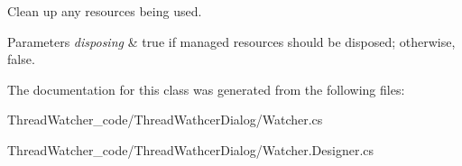 Clean up any resources being used. 


\begin{DoxyParams}{Parameters}
{\em disposing} & true if managed resources should be disposed; otherwise, false.\\
\hline
\end{DoxyParams}


The documentation for this class was generated from the following files\+:\begin{DoxyCompactItemize}
\item 
Thread\+Watcher\+\_\+code/\+Thread\+Wathcer\+Dialog/Watcher.\+cs\item 
Thread\+Watcher\+\_\+code/\+Thread\+Wathcer\+Dialog/Watcher.\+Designer.\+cs\end{DoxyCompactItemize}
